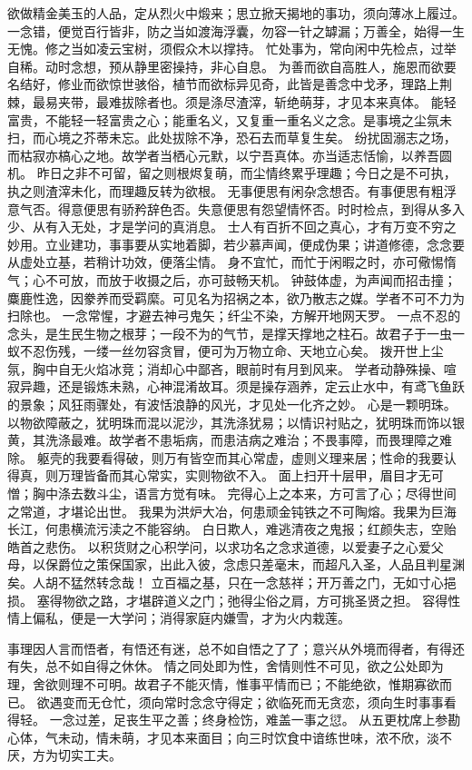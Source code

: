 \documentclass[12pt,UTF8]{ctexbook}
\begin{document}
欲做精金美玉的人品，定从烈火中煅来；思立掀天揭地的事功，须向薄冰上履过。
一念错，便觉百行皆非，防之当如渡海浮囊，勿容一针之罅漏；万善全，始得一生无愧。修之当如凌云宝树，须假众木以撑持。
忙处事为，常向闲中先检点，过举自稀。动时念想，预从静里密操持，非心自息。
为善而欲自高胜人，施恩而欲要名结好，修业而欲惊世骇俗，植节而欲标异见奇，此皆是善念中戈矛，理路上荆棘，最易夹带，最难拔除者也。须是涤尽渣滓，斩绝萌芽，才见本来真体。
能轻富贵，不能轻一轻富贵之心；能重名义，又复重一重名义之念。是事境之尘氛未扫，而心境之芥蒂未忘。此处拔除不净，恐石去而草复生矣。
纷扰固溺志之场，而枯寂亦槁心之地。故学者当栖心元默，以宁吾真体。亦当适志恬愉，以养吾圆机。
昨日之非不可留，留之则根烬复萌，而尘情终累乎理趣；今日之是不可执，执之则渣滓未化，而理趣反转为欲根。
无事便思有闲杂念想否。有事便思有粗浮意气否。得意便思有骄矜辞色否。失意便思有怨望情怀否。时时检点，到得从多入少、从有入无处，才是学问的真消息。
士人有百折不回之真心，才有万变不穷之妙用。立业建功，事事要从实地着脚，若少慕声闻，便成伪果；讲道修德，念念要从虚处立基，若稍计功效，便落尘情。
身不宜忙，而忙于闲暇之时，亦可儆惕惰气；心不可放，而放于收摄之后，亦可鼓畅天机。
钟鼓体虚，为声闻而招击撞；麋鹿性逸，因豢养而受羁縻。可见名为招祸之本，欲乃散志之媒。学者不可不力为扫除也。
一念常惺，才避去神弓鬼矢；纤尘不染，方解开地网天罗。
一点不忍的念头，是生民生物之根芽；一段不为的气节，是撑天撑地之柱石。故君子于一虫一蚁不忍伤残，一缕一丝勿容贪冒，便可为万物立命、天地立心矣。
拨开世上尘氛，胸中自无火焰冰竞；消却心中鄙吝，眼前时有月到风来。
学者动静殊操、喧寂异趣，还是锻炼未熟，心神混淆故耳。须是操存涵养，定云止水中，有鸢飞鱼跃的景象；风狂雨骤处，有波恬浪静的风光，才见处一化齐之妙。
心是一颗明珠。以物欲障蔽之，犹明珠而混以泥沙，其洗涤犹易；以情识衬贴之，犹明珠而饰以银黄，其洗涤最难。故学者不患垢病，而患洁病之难治；不畏事障，而畏理障之难除。
躯壳的我要看得破，则万有皆空而其心常虚，虚则义理来居；性命的我要认得真，则万理皆备而其心常实，实则物欲不入。
面上扫开十层甲，眉目才无可憎；胸中涤去数斗尘，语言方觉有味。
完得心上之本来，方可言了心；尽得世间之常道，才堪论出世。
我果为洪炉大冶，何患顽金钝铁之不可陶熔。我果为巨海长江，何患横流污渎之不能容纳。
白日欺人，难逃清夜之鬼报；红颜失志，空贻皓首之悲伤。
以积货财之心积学问，以求功名之念求道德，以爱妻子之心爱父母，以保爵位之策保国家，出此入彼，念虑只差毫末，而超凡入圣，人品且判星渊矣。人胡不猛然转念哉！
立百福之基，只在一念慈祥；开万善之门，无如寸心挹损。
塞得物欲之路，才堪辟道义之门；弛得尘俗之肩，方可挑圣贤之担。
容得性情上偏私，便是一大学问；消得家庭内嫌雪，才为火内栽莲。

事理因人言而悟者，有悟还有迷，总不如自悟之了了；意兴从外境而得者，有得还有失，总不如自得之休休。
情之同处即为性，舍情则性不可见，欲之公处即为理，舍欲则理不可明。故君子不能灭情，惟事平情而已；不能绝欲，惟期寡欲而已。
欲遇变而无仓忙，须向常时念念守得定；欲临死而无贪恋，须向生时事事看得轻。
一念过差，足丧生平之善；终身检饬，难盖一事之愆。
从五更枕席上参勘心体，气未动，情未萌，才见本来面目；向三时饮食中谙练世味，浓不欣，淡不厌，方为切实工夫。
\end{document}
